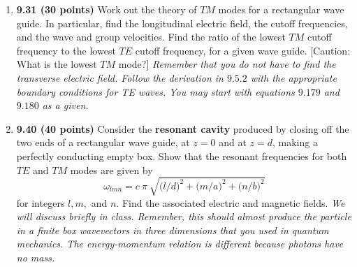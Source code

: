\documentclass[fleqn]{article}
\begin{document}
\begin{enumerate}
    \item \textbf{9.31 (30 points)} Work out the theory of $TM$ modes for a rectangular wave guide. In particular, find the 
    longitudinal electric field, the cutoff frequencies, and the wave and group velocities. Find the ratio of the lowest 
    $TM$ cutoff frequency to the lowest $TE$ cutoff frequency, for a given wave guide. [Caution: What is the lowest $TM$ mode?]
    \emph{Remember that you do not have to find the transverse electric field.  Follow the derivation in $9.5.2$ with the 
    appropriate boundary conditions for TE waves.  You may start with equations $9.179$ and $9.180$ as a given.}


    \item \textbf{9.40 (40 points)} Consider the \textbf{resonant cavity} produced by closing off the two ends of a rectangular 
    wave guide, at $z=0$ and at $z=d$, making a perfectly conducting empty box. Show that the resonant frequencies for 
    both $TE$ and $TM$ modes are given by
    $$
      \omega_{lmn}=c ~ \pi ~ \sqrt{\bigg(l/d \bigg)^2+\bigg(m/a \bigg)^2+\bigg(n/b \bigg)^2} 
    $$
    for integers $l, m,$ and $n$. Find the associated electric and magnetic fields.
    \emph{We will discuss briefly in class.  Remember, this should almost produce the particle in 
    a finite box wavevectors in three dimensions that you used in quantum mechanics. 
    The energy-momentum relation is different because photons have no mass.}


  \end{enumerate}
\end{document}
